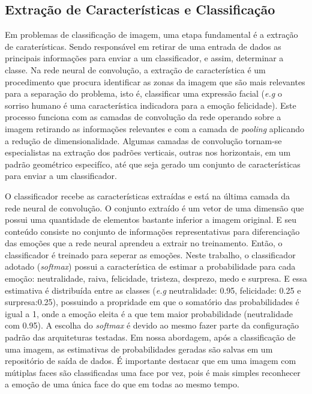 \subsection{Extração de Características e Classificação}
Em problemas de classificação de imagem, uma etapa fundamental é a extração de caraterísticas. Sendo responsável em retirar de uma entrada de dados as principais informações para enviar a um classificador, e assim, determinar a classe. Na rede neural de convolução, a extração de característica é um procedimento que procura identificar as zonas da imagem que são mais relevantes para a separação do problema, isto é, classificar uma expressão facial (\textit{e.g} o sorriso humano é uma característica indicadora para a emoção felicidade). Este processo funciona com as camadas de convolução da rede operando sobre a imagem retirando as informações relevantes e com a camada de \textit{pooling} aplicando a redução de dimensionalidade. Algumas camadas de convolução tornam-se especialistas na extração dos padrões verticais, outras nos horizontais, em um padrão geométrico especifíco, até que seja gerado um conjunto de características para enviar a um classificador.

O classificador recebe as características extraídas e está na última camada da rede neural de convolução. O conjunto extraído é um vetor de uma dimensão que possui uma quantidade de elementos bastante inferior a imagem original. E seu conteúdo consiste no conjunto de informações representativas para diferenciação das emoções que a rede neural aprendeu a extrair no treinamento. Então, o classificador é treinado para seperar as emoções. Neste trabalho, 
o classificador adotado (\textit{softmax}) possui a característica de estimar a probabilidade para cada emoção: neutralidade, raiva, felicidade, tristeza, desprezo, medo e surpresa. E essa estimativa é distribuída entre as classes (\textit{e.g} neutralidade: 0.95, felicidade: 0.25 e surpresa:0.25), possuindo a propridade em que o somatório das probabilidades é igual a 1, onde a emoção eleita é a que tem maior probabilidade (neutralidade com 0.95). A escolha do \textit{softmax} é devido ao mesmo fazer parte da configuração padrão das arquiteturas testadas. Em nossa abordagem, após a classificação de uma imagem, as estimativas de probabilidades geradas são salvas em um repositório de saída de dados. É importante destacar que em uma imagem com mútiplas faces são classificadas uma face por vez, pois é mais simples reconhecer a emoção de uma única face do que em todas ao mesmo tempo.   


